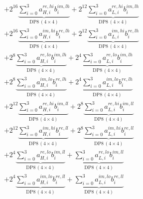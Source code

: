 \documentclass[fleqn]{article}
\newcommand{\DPop}[3]{\mathrm{DP#1}\,(#2\!\times\!#3)}
\begin{document}
\begin{align*}
  & + 2^{16}\underbrace{\sum_{i=0}^{3} a_{H,i}^{re,hi} b_i^{im,lh}}_{\DPop{8}{4}{4}} + 2^{12}\underbrace{\sum_{i=0}^{3} a_{L,i}^{re,hi} b_i^{im,lh}}_{\DPop{8}{4}{4}} \\[0.4em]
  & + 2^{16}\underbrace{\sum_{i=0}^{3} a_{H,i}^{im,hi} b_i^{re,lh}}_{\DPop{8}{4}{4}} + 2^{12}\underbrace{\sum_{i=0}^{3} a_{L,i}^{im,hi} b_i^{re,lh}}_{\DPop{8}{4}{4}} \\[0.4em]
  & + 2^{8}\underbrace{\sum_{i=0}^{3} a_{H,i}^{re,lo} b_i^{im,lh}}_{\DPop{8}{4}{4}} + 2^{4}\underbrace{\sum_{i=0}^{3} a_{L,i}^{re,lo} b_i^{im,lh}}_{\DPop{8}{4}{4}} \\[0.4em]
  & + 2^{8}\underbrace{\sum_{i=0}^{3} a_{H,i}^{im,lo} b_i^{re,lh}}_{\DPop{8}{4}{4}} + 2^{4}\underbrace{\sum_{i=0}^{3} a_{L,i}^{im,lo} b_i^{re,lh}}_{\DPop{8}{4}{4}} \\[0.4em]
  & + 2^{12}\underbrace{\sum_{i=0}^{3} a_{H,i}^{re,hi} b_i^{im,ll}}_{\DPop{8}{4}{4}} + 2^{8}\underbrace{\sum_{i=0}^{3} a_{L,i}^{re,hi} b_i^{im,ll}}_{\DPop{8}{4}{4}} \\[0.4em]
  & + 2^{12}\underbrace{\sum_{i=0}^{3} a_{H,i}^{im,hi} b_i^{re,ll}}_{\DPop{8}{4}{4}} + 2^{8}\underbrace{\sum_{i=0}^{3} a_{L,i}^{im,hi} b_i^{re,ll}}_{\DPop{8}{4}{4}} \\[0.4em]
  & + 2^{4}\underbrace{\sum_{i=0}^{3} a_{H,i}^{re,lo} b_i^{im,ll}}_{\DPop{8}{4}{4}} + \underbrace{\sum_{i=0}^{3} a_{L,i}^{re,lo} b_i^{im,ll}}_{\DPop{8}{4}{4}} \\[0.4em]
  & + 2^{4}\underbrace{\sum_{i=0}^{3} a_{H,i}^{im,lo} b_i^{re,ll}}_{\DPop{8}{4}{4}} + \underbrace{\sum_{i=0}^{3} a_{L,i}^{im,lo} b_i^{re,ll}}_{\DPop{8}{4}{4}}
\end{align*}
\end{document}
